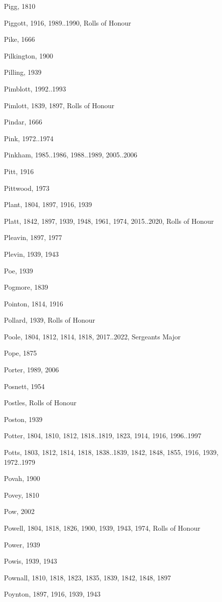 {\begin{theindex}
\item Pigg, 1810
\item Piggott, 1916, 1989..1990, Rolls of Honour
\item Pike, 1666
\item Pilkington, 1900
\item Pilling, 1939
\item Pimblott, 1992..1993
\item Pimlott, 1839, 1897, Rolls of Honour
\item Pindar, 1666
\item Pink, 1972..1974
\item Pinkham, 1985..1986, 1988..1989, 2005..2006
\item Pitt, 1916
\item Pittwood, 1973
\item Plant, 1804, 1897, 1916, 1939
\item Platt, 1842, 1897, 1939, 1948, 1961, 1974, 2015..2020, Rolls of Honour
\item Pleavin, 1897, 1977
\item Plevin, 1939, 1943
\item Poe, 1939
\item Pogmore, 1839
\item Pointon, 1814, 1916
\item Pollard, 1939, Rolls of Honour
\item Poole, 1804, 1812, 1814, 1818, 2017..2022, Sergeants Major
\item Pope, 1875
\item Porter, 1989, 2006
\item Posnett, 1954
\item Postles, Rolls of Honour
\item Poston, 1939
\item Potter, 1804, 1810, 1812, 1818..1819, 1823, 1914, 1916, 1996..1997
\item Potts, 1803, 1812, 1814, 1818, 1838..1839, 1842, 1848, 1855, 1916, 1939, 1972..1979
\item Povah, 1900
\item Povey, 1810
\item Pow, 2002
\item Powell, 1804, 1818, 1826, 1900, 1939, 1943, 1974, Rolls of Honour
\item Power, 1939
\item Powis, 1939, 1943
\item Pownall, 1810, 1818, 1823, 1835, 1839, 1842, 1848, 1897
\item Poynton, 1897, 1916, 1939, 1943

\end{theindex}}
